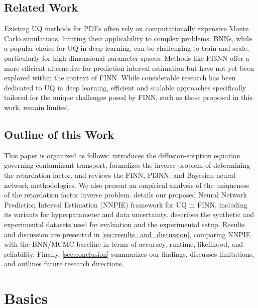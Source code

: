 \section{Related Work}
Existing UQ methods for PDEs often rely on computationally expensive Monte Carlo simulations, limiting their applicability to complex problems. BNNs, while a popular choice for UQ in deep learning, can be challenging to train and scale, particularly for high-dimensional parameter spaces. Methods like PI3NN offer a more efficient alternative for prediction interval estimation but have not yet been explored within the context of FINN. While considerable research has been dedicated to UQ in deep learning, efficient and scalable approaches specifically tailored for the unique challenges posed by FINN, such as those proposed in this work, remain limited. %


\section{Outline of this Work}
This paper is organized as follows:  introduces the diffusion-sorption equation governing contaminant transport, formalizes the inverse problem of determining the retardation factor, and reviews the FINN, PI3NN, and Bayesian neural network methodologies. We also present an empirical analysis of the uniqueness of the retardation factor inverse problem.  details our proposed Neural Network Prediction Interval Estimation (NNPIE) framework for UQ in FINN, including its variants for hyperparameter and data uncertainty.  describes the synthetic and experimental datasets used for evaluation and the experimental setup. Results and discussion are presented in \cref{sec:results_and_discussion}, comparing NNPIE with the BNN/MCMC baseline in terms of accuracy, runtime, likelihood, and reliability. Finally, \cref{sec:conclusion} summarizes our findings, discusses limitations, and outlines future research directions.



\chapter{Basics}
\label{sec:basics}

